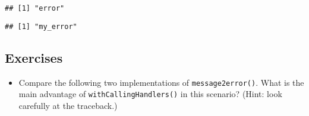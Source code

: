 \begin{Shaded}
\begin{Highlighting}[]
\NormalTok{(}\NormalTok{(}\NormalTok{, }\NormalTok{),}
   \NormalTok{,}
   
\NormalTok{)}
\end{Highlighting}
\end{Shaded}

\begin{verbatim}
## [1] "error"
\end{verbatim}

\begin{Shaded}
\begin{Highlighting}[]
\NormalTok{(}\NormalTok{(}\NormalTok{, }\NormalTok{),}
   \NormalTok{,}
   
\NormalTok{)}
\end{Highlighting}
\end{Shaded}

\begin{verbatim}
## [1] "my_error"
\end{verbatim}

\hypertarget{exercises}{%
\subsection{Exercises}\label{exercises}}

\begin{itemize}
\item
  Compare the following two implementations of \texttt{message2error()}.
  What is the main advantage of \texttt{withCallingHandlers()} in this
  scenario? (Hint: look carefully at the traceback.)

\begin{Shaded}
\begin{Highlighting}[]
\StringTok{ }
   
\NormalTok{\}}
\StringTok{ }
   
\NormalTok{\}}
\end{Highlighting}
\end{Shaded}
\end{itemize}

